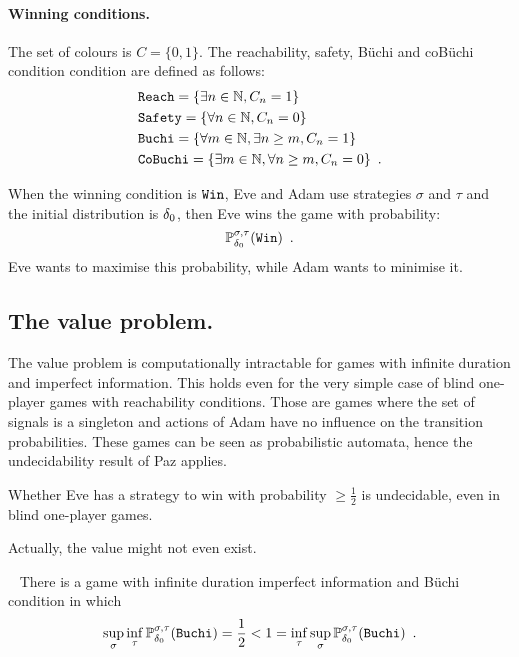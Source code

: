 \newcommand{\win}{{\tt Win}}
\newcommand{\winreach}{{\tt Reach}}
\newcommand{\winsafe}{{\tt Safety}}
\newcommand{\winbuchi}{{\tt Buchi}}
\newcommand{\wincobuchi}{{\tt CoBuchi}}
\paragraph{Winning conditions.}

The set of colours is $C=\{0,1\}$.
The reachability, safety, B{\"u}chi and coB{\"u}chi condition
 condition are defined as follows:
 \begin{align*}
 &\winreach=\{\exists n\in\NN, C_n  = 1\}\\
&\winsafe=\{\forall n\in\NN, C_n = 0\}\\
&\winbuchi=\{\forall m \in \NN, \exists n \geq m, C_n=1\}\\
&\wincobuchi = \{\exists m \in \NN, \forall n \geq m, C_n = 0\}\enspace.
\end{align*}

When the winning condition is $\win$,
Eve and Adam use strategies
$\sigma$ and $\tau$ and the initial distribution is $\delta_0$,
then Eve wins the game with probability:
\[
\mathbb{P}^{\sigma,\tau}_{\ini}(\win)\enspace.
\]
Eve wants to maximise this probability, while Adam wants
to minimise it.  



\subsection{The value problem.}

The value problem is computationally intractable
for games with infinite duration and imperfect information.
This holds even for the very simple case
of blind one-player games with reachability conditions.
Those are games where the set of
signals is a singleton and actions of Adam have no influence
on the transition probabilities. These games can be seen
as probabilistic automata, hence the undecidability result of Paz applies.

\begin{theorem}\cite{Paz}
Whether Eve has a strategy to win with probability $\geq \frac{1}{2}$
is undecidable, even in blind one-player games.
\end{theorem}

Actually, the value might not even exist.
\begin{proposition}~\cite{repgames}
There is a game with infinite duration imperfect information and B{\"u}chi condition
in which 
\[
\sup_\sigma \inf_\tau \mathbb{P}^{\sigma,\tau}_{\ini}(\winbuchi)
=
\frac{1}{2}
<
1
=
\inf_\tau \sup_\sigma  \mathbb{P}^{\sigma,\tau}_{\ini}(\winbuchi)\enspace.
\]
\end{proposition}


